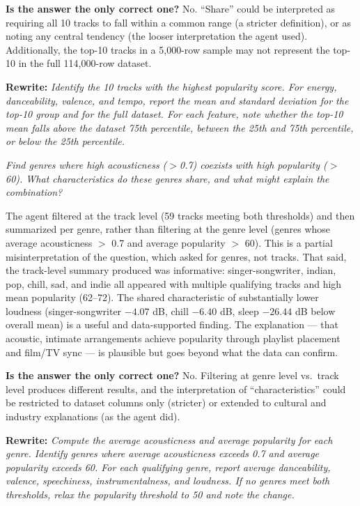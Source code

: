 \documentclass[12pt, oneside]{report}
\begin{document}
\textbf{Is the answer the only correct one?} No. ``Share'' could be interpreted as requiring all 10 tracks to fall within a common range (a stricter definition), or as noting any central tendency (the looser interpretation the agent used). Additionally, the top-10 tracks in a 5,000-row sample may not represent the top-10 in the full 114,000-row dataset.

\textbf{Rewrite:} \textit{Identify the 10 tracks with the highest popularity score. For energy, danceability, valence, and tempo, report the mean and standard deviation for the top-10 group and for the full dataset. For each feature, note whether the top-10 mean falls above the dataset 75th percentile, between the 25th and 75th percentile, or below the 25th percentile.}


\textit{Find genres where high acousticness ($>$0.7) coexists with high popularity ($>$60). What characteristics do these genres share, and what might explain the combination?}

The agent filtered at the track level (59 tracks meeting both thresholds) and then summarized per genre, rather than filtering at the genre level (genres whose average acousticness $>$ 0.7 and average popularity $>$ 60). This is a partial misinterpretation of the question, which asked for genres, not tracks. That said, the track-level summary produced was informative: singer-songwriter, indian, pop, chill, sad, and indie all appeared with multiple qualifying tracks and high mean popularity (62--72). The shared characteristic of substantially lower loudness (singer-songwriter $-4.07$ dB, chill $-6.40$ dB, sleep $-26.44$ dB below overall mean) is a useful and data-supported finding. The explanation --- that acoustic, intimate arrangements achieve popularity through playlist placement and film/TV sync --- is plausible but goes beyond what the data can confirm.

\textbf{Is the answer the only correct one?} No. Filtering at genre level vs.\ track level produces different results, and the interpretation of ``characteristics'' could be restricted to dataset columns only (stricter) or extended to cultural and industry explanations (as the agent did).

\textbf{Rewrite:} \textit{Compute the average acousticness and average popularity for each genre. Identify genres where average acousticness exceeds 0.7 and average popularity exceeds 60. For each qualifying genre, report average danceability, valence, speechiness, instrumentalness, and loudness. If no genres meet both thresholds, relax the popularity threshold to 50 and note the change.}
\end{document}

